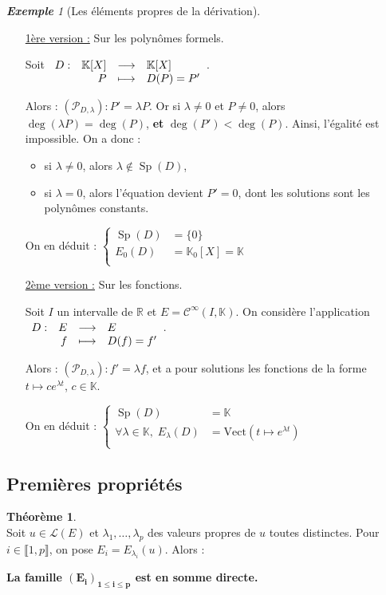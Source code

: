 \documentclass[12pt]{book}
\let\ensembleNombre\mathbb
\newcommand*\R{\ensuremath{\ensembleNombre{R}}}
\newcommand*\K{\ensuremath{\ensembleNombre{K}}}
\newcommand{\app}[5]{\ensuremath{
\begin{array}[t]{lrcl}
#1 : & #2 & \longrightarrow & #3 \\
    & #4 & \longmapsto & #5 \end{array}
}}
\DeclareMathOperator{\Sp}{Sp}
\theoremstyle{definition}
\newtheorem{thme}{Théorème}[chapter]
\theoremstyle{remark}
\newtheorem*{ex}{\textbf{Exemple}}
\newenvironment{fthme}
  {\begin{mdframed}[roundcorner=10pt, linewidth=2pt]\begin{thme}}
  {\end{thme}\end{mdframed}}
\begin{document}
	\begin{ex}[Les éléments propres de la dérivation] \mbox{~}\\
	\begin{itemize}
	\item[\underline{1ère version :}] Sur les polynômes formels.
	
	Soit $\app{D}{\K[X]}{\K[X]}{P}{D(P) = P'}$. 
	
	Alors : $(\mathcal P_{D, \lambda} ) : P' = \lambda P$. Or si $\lambda \neq 0$ et $P \neq 0$, alors $\deg (\lambda P) = \deg(P)$, \textbf{et} $\deg(P') < \deg(P)$. Ainsi, l'égalité est impossible. On a donc :
		\begin{itemize}
		\item si $\lambda \neq 0$, alors $\lambda \not\in \Sp(D)$,
		\item si $\lambda = 0$, alors l'équation devient $P' = 0$, dont les solutions sont les polynômes constants.
		\end{itemize}
		
		On en déduit :
		$\begin{cases}
		\Sp(D) &= \lbrace 0 \rbrace \\
		E_0(D) &= \K_0[X] = \K \\
		\end{cases}$
		
	\item[\underline{2ème version :}] Sur les fonctions.
	
	Soit $I$ un intervalle de $\R$ et $E = \mathcal C^{\infty} (I, \K)$. On considère l'application $\app{D}{E}{E}{f}{D(f) = f'}$.
	
	Alors : $(\mathcal P_{D, \lambda}) : f' = \lambda f$, et a pour solutions les fonctions de la forme $t \mapsto ce^{\lambda t}$, $c \in \K$.
	
	On en déduit : 
	$\begin{cases}
	\Sp(D) &= \K \\
	\forall \lambda \in \K,\; E_\lambda(D) &= \mathrm{Vect}(t \mapsto e^{\lambda t}) \\
	\end{cases}$
	\end{itemize}
	\end{ex}
	
	\subsection{Premières propriétés}
	
	\begin{fthme} \mbox{~}\\
	Soit $u \in \mathcal L(E)$ et $\lambda_1, \ldots, \lambda_p$ des valeurs propres de $u$ toutes distinctes. Pour $i \in \llbracket 1, p \rrbracket$, on pose $E_i = E_{\lambda_i}(u)$. Alors :	
	\begin{center}
	\textbf{La famille $\mathbf{(E_i)_{1 \leq i \leq p}}$ est en somme directe.}
	\end{center}
	\end{fthme}
	
\end{document}
